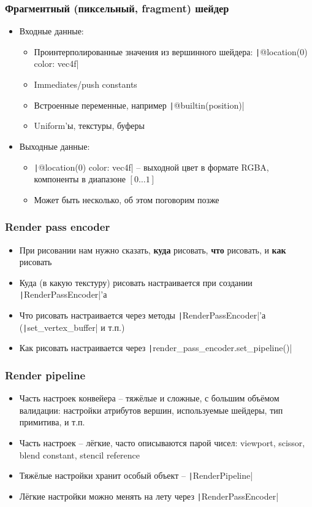 \documentclass[10pt]{beamer}
\begin{document}
\begin{frame}[fragile]
\frametitle{Фрагментный (пиксельный, fragment) шейдер}
\begin{itemize}
\pause
\item Входные данные:
\pause
\begin{itemize}
\item Проинтерполированные значения из вершинного шейдера: \texttt|@location(0) color: vec4f|
\pause
\item Immediates/push constants
\pause
\item Встроенные переменные, например \texttt|@builtin(position)|
\pause
\item Uniform'ы, текстуры, буферы
\end{itemize}
\pause
\item Выходные данные:
\begin{itemize}
\item \texttt|@location(0) color: vec4f| -- выходной цвет в формате RGBA, компоненты в диапазоне \([0\dots 1]\)
\pause
\item Может быть несколько, об этом поговорим позже
\end{itemize}
\end{itemize}
\end{frame}

\begin{frame}[fragile]
\frametitle{Render pass encoder}
\begin{itemize}
\item При рисовании нам нужно сказать, \textbf{куда} рисовать, \textbf{что} рисовать, и \textbf{как} рисовать
\pause
\item Куда (в какую текстуру) рисовать настраивается при создании \texttt|RenderPassEncoder|'а
\pause
\item Что рисовать настраивается через методы \texttt|RenderPassEncoder|'а (\texttt|set_vertex_buffer| и т.п.)
\pause
\item Как рисовать настраивается через \texttt|render_pass_encoder.set_pipeline()|
\end{itemize}
\end{frame}

\begin{frame}[fragile]
\frametitle{Render pipeline}
\begin{itemize}
\item Часть настроек конвейера -- тяжёлые и сложные, с большим объёмом валидации: настройки атрибутов вершин, используемые шейдеры, тип примитива, и т.п.
\pause
\item Часть настроек -- лёгкие, часто описываются парой чисел: viewport, scissor, blend constant, stencil reference
\pause
\item Тяжёлые настройки хранит особый объект -- \texttt|RenderPipeline|
\pause
\item Лёгкие настройки можно менять на лету через \texttt|RenderPassEncoder|
\end{itemize}
\end{frame}
\end{document}
